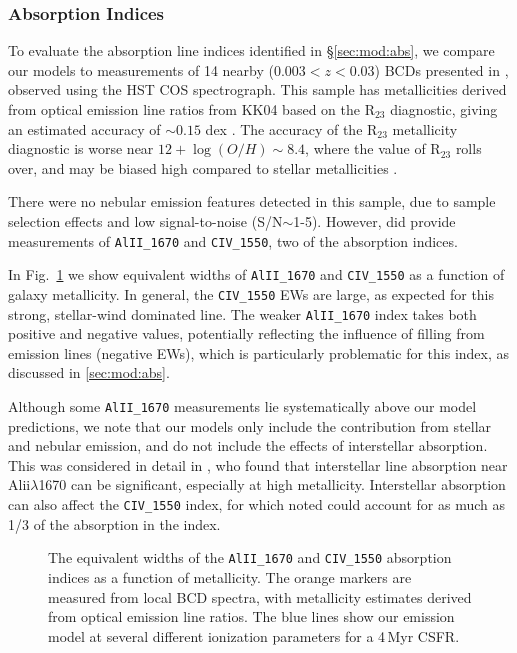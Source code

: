 \documentclass[preprint2]{aastex61}
\newcommand{\Myr}{$\,$Myr\xspace}
\begin{document}
\subsubsection{Absorption Indices} \label{sec:obs:UV:BCDs}

To evaluate the absorption line indices identified in \S\ref{sec:mod:abs}, we compare our models to measurements of 14 nearby ($0.003 < z < 0.03$) BCDs presented in \citet{Zetterlund+2015}, observed using the HST COS spectrograph. This sample has metallicities derived from optical emission line ratios from KK04 based on the R$_{23}$ diagnostic, giving an estimated accuracy of ${\sim}0.15$ dex \citep{Zetterlund+2015}. The accuracy of the R$_{23}$ metallicity diagnostic is worse near $12+\log(O/H)\sim 8.4$, where the value of R$_{23}$ rolls over, and may be biased high compared to stellar metallicities \citep[e.g.,][]{Kudritzki+2012}.

There were no nebular emission features detected in this sample, due to sample selection effects and low signal-to-noise (S/N${\sim}$1-5). However, \citet{Zetterlund+2015} did provide measurements of \texttt{AlII\_1670} and \texttt{CIV\_1550}, two of the \citet{Leitherer+2011} absorption indices.

In Fig.~\ref{fig:BCDabs} we show equivalent widths of \texttt{AlII\_1670} and \texttt{CIV\_1550} as a function of galaxy metallicity. In general, the \texttt{CIV\_1550} EWs are large, as expected for this strong, stellar-wind dominated line. The weaker \texttt{AlII\_1670} index takes both positive and negative values, potentially reflecting the influence of filling from emission lines (negative EWs), which is particularly problematic for this index, as discussed in \ref{sec:mod:abs}. 

Although some \texttt{AlII\_1670} measurements lie systematically above our model predictions, we note that our models only include the contribution from stellar and nebular emission, and do not include the effects of interstellar absorption. This was considered in detail in \citet{Vidal-Garcia+2017}, who found that interstellar line absorption near Al{\sc ii}$\lambda$1670 can be significant, especially at high metallicity. Interstellar absorption can also affect the \texttt{CIV\_1550} index, for which \citet{Leitherer+2011} noted could account for as much as 1/3 of the absorption in the index.

\begin{figure}
  \begin{center}
    \caption{The equivalent widths of the \texttt{AlII\_1670} and \texttt{CIV\_1550} \citet{Leitherer+2011} absorption indices as a function of metallicity. The orange markers are measured from local BCD spectra, with metallicity estimates derived from optical emission line ratios. The blue lines show our emission model at several different ionization parameters for a 4\Myr CSFR.}
    \label{fig:BCDabs}
  \end{center}
\end{figure}
\end{document}
